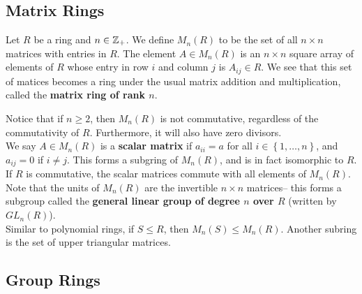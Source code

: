 \documentclass{memoir}
\begin{document}
\subsection{Matrix Rings}
\label{sub:matrix_rings}

\begin{defn}
	Let \(R\) be a ring and \(n\in \mathbb{Z}_+\). We define \(M_n(R)\) to be the set of all \(n\times n\) matrices with entries in \(R\). The element \(A \in M_n(R)\) is an \(n\times n\) square array of elements of \(R\) whose entry in row \(i\) and column \(j\) is \(A_{ij} \in R\). We see that this set of matices becomes a ring under the usual matrix addition and multiplication, called the \textbf{matrix ring of rank \(n\)}.
\end{defn}
Notice that if \(n\geq 2\), then \(M_n(R)\) is not commutative, regardless of the commutativity of \(R\). Furthermore, it will also have zero divisors.\\

We say \(A \in M_n(R)\) is a \textbf{scalar matrix} if \(a_{ii}=a\) for all \(i \in \left\{ 1,\ldots,n \right\} \), and \(a_{ij}=0\) if \(i\neq j\). This forms a subgring of \(M_n(R)\), and is in fact isomorphic to \(R\). If \(R\) is commutative, the scalar matrices commute with all elements of \(M_n(R)\).\\

Note that the units of \(M_n(R)\) are the invertible \(n\times n\) matrices-- this forms a subgroup called the \textbf{general linear group of degree \(n\) over \(R\)} (written by \(GL_n(R)\)).\\

Similar to polynomial rings, if \(S\leq R\), then \(M_n(S) \leq M_n(R)\). Another subring is the set of upper triangular matrices.

\subsection{Group Rings}
\label{sub:group_rings}
\end{document}
